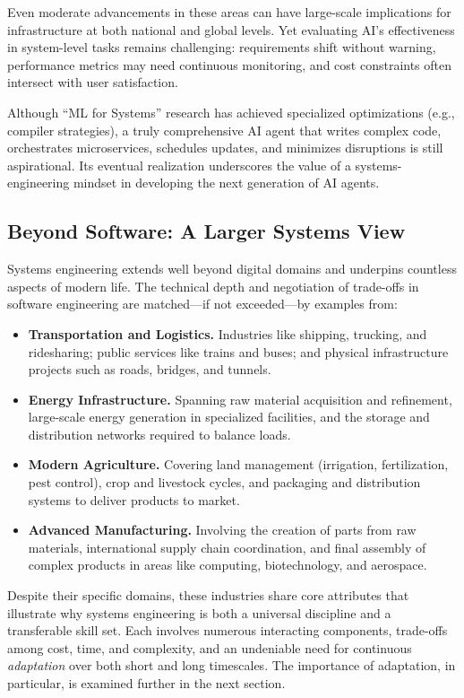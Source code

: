 Even moderate advancements in these areas can have large-scale implications for infrastructure at both national and global levels. Yet evaluating AI’s effectiveness in system-level tasks remains challenging: requirements shift without warning, performance metrics may need continuous monitoring, and cost constraints often intersect with user satisfaction. 

Although “ML for Systems” research has achieved specialized optimizations (e.g., compiler strategies), a truly comprehensive AI agent that writes complex code, orchestrates microservices, schedules updates, and minimizes disruptions is still aspirational. Its eventual realization underscores the value of a systems-engineering mindset in developing the next generation of AI agents.

\subsection{Beyond Software: A Larger Systems View}
Systems engineering extends well beyond digital domains \cite{blanchard2010} and underpins countless aspects of modern life. The technical depth and negotiation of trade-offs in software engineering are matched—if not exceeded—by examples from:
\begin{itemize}
    \item \textbf{Transportation and Logistics.} Industries like shipping, trucking, and ridesharing; public services like trains and buses; and physical infrastructure projects such as roads, bridges, and tunnels.
    \item \textbf{Energy Infrastructure.} Spanning raw material acquisition and refinement, large-scale energy generation in specialized facilities, and the storage and distribution networks required to balance loads.
    \item \textbf{Modern Agriculture.} Covering land management (irrigation, fertilization, pest control), crop and livestock cycles, and packaging and distribution systems to deliver products to market.
    \item \textbf{Advanced Manufacturing.} Involving the creation of parts from raw materials, international supply chain coordination, and final assembly of complex products in areas like computing, biotechnology, and aerospace.
\end{itemize}

Despite their specific domains, these industries share core attributes that illustrate why systems engineering is both a universal discipline and a transferable skill set. Each involves numerous interacting components, trade-offs among cost, time, and complexity, and an undeniable need for continuous \textit{adaptation} over both short and long timescales. The importance of adaptation, in particular, is examined further in the next section.

